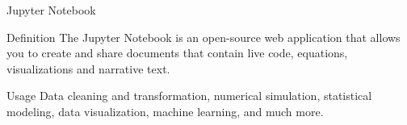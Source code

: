 \begin{frame}{Jupyter Notebook}
\begin{block}{Definition}
The Jupyter Notebook is an open-source web application that allows you to create and share documents that contain live code, equations, visualizations and narrative text.
\end{block}

\begin{block}{Usage}
Data cleaning and transformation, numerical simulation, statistical modeling, data visualization, machine learning, and much more.
\end{block}

\end{frame}